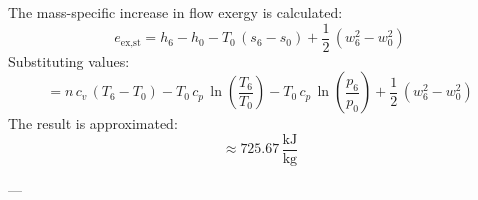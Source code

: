 The mass-specific increase in flow exergy is calculated:  
\[
e_{\text{ex,st}} = h_6 - h_0 - T_0 \, (s_6 - s_0) + \frac{1}{2} \, (w_6^2 - w_0^2)
\]  
Substituting values:  
\[
= n \, c_v \, (T_6 - T_0) - T_0 \, c_p \, \ln \left( \frac{T_6}{T_0} \right) - T_0 \, c_p \, \ln \left( \frac{p_6}{p_0} \right) + \frac{1}{2} \, (w_6^2 - w_0^2)
\]  
The result is approximated:  
\[
\approx 725.67 \, \frac{\text{kJ}}{\text{kg}}
\]

---